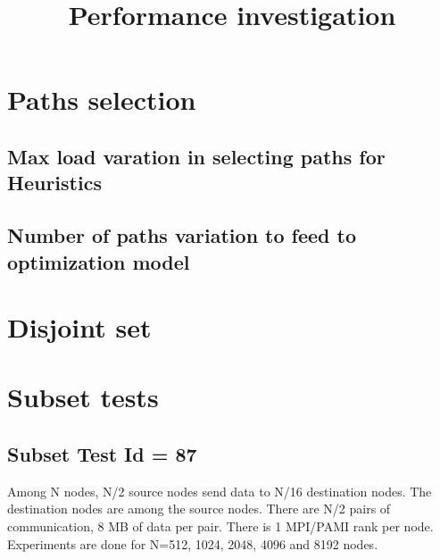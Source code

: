 \documentclass[letter]{article}
\title{Performance investigation}
\begin{document}
\maketitle

\section{Paths selection}

\subsection{Max load varation in selecting paths for Heuristics}

\subsection{Number of paths variation to feed to optimization model}

\section{Disjoint set}


\section{Subset tests}

\subsection{Subset Test Id = 87}

Among N nodes, N/2 source nodes send data to N/16 destination nodes. The destination nodes are among the source nodes. There are N/2 pairs of communication, 8 MB of data per pair. There is 1 MPI/PAMI rank per node. Experiments are done for N=512, 1024, 2048, 4096 and 8192 nodes.
\end{document}
